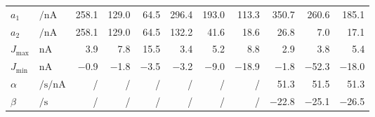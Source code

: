 \begin{table}[p]
\begin{tabular}{l l   r r r   r r r   r r r}
		$a_1$ & $\si{\per\nano\ampere}$ &
		\num{258.1} & \num{129.0} & \num{64.5} &
		\num{296.4} & \num{193.0} & \num{113.3} &
		\num{350.7} & \num{260.6} & \num{185.1} \\

		$a_2$ & $\si{\per\nano\ampere}$ &
		\num{258.1} & \num{129.0} & \num{64.5} &
		\num{132.2} & \num{41.6} & \num{18.6} &
		\num{26.8} & \num{7.0} & \num{17.1} \\[2.5mm]

	
		$J_\mathrm{max}$ & $\si{\nano\ampere}$ &
		\num{3.9} & \num{7.8} & \num{15.5} &
		\num{3.4} & \num{5.2} & \num{8.8} &
		\num{2.9} & \num{3.8} & \num{5.4} \\

		$J_\mathrm{min}$ & $\si{\nano\ampere}$ &
		\num{-0.9} & \num{-1.8} & \num{-3.5} &
		\num{-3.2} & \num{-9.0} & \num{-18.9} &
		\num{-1.8} &\num{-52.3} & \num{-18.0} \\[2.5mm]

		$\alpha$ & $\si{\per\second\per\nano\ampere}$ &
		/&/&/&/&/&/&
		\num{51.3} & \num{51.5} & \num{51.3}
		\\
		$\beta$ & $\si{\per\second}$ &
		/&/&/&/&/&/&
		\num{-22.8} & \num{-25.1} & \num{-26.5}\\
		\bottomrule
	\end{tabular}
	\label{tbl:two_comp_model_parameters}
\end{table}
